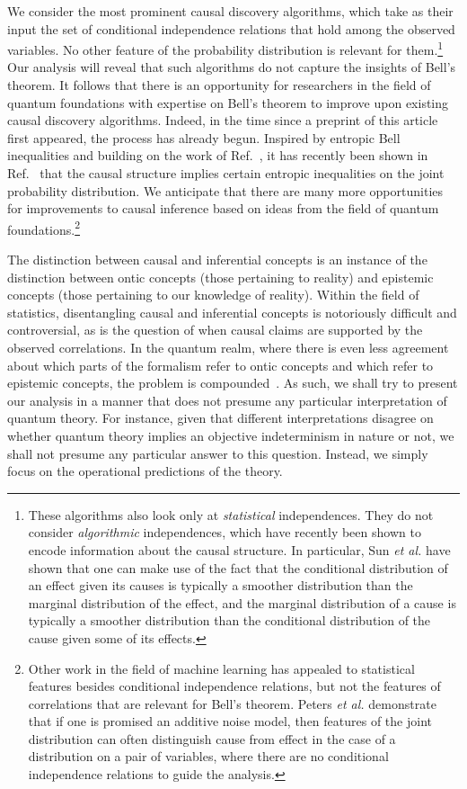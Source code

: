 \documentclass[letterpaper,onecolumn,nofootinbib]{revtex4}
\begin{document}
 
We consider the most prominent causal discovery algorithms, which take as their input the set of conditional independence relations that hold among the observed variables.  No other feature of the probability distribution is relevant for them.\footnote{These algorithms also look only at \emph{statistical} independences.  They do not consider \emph{algorithmic} independences, which have recently been shown to encode information about the causal structure.  In particular, Sun \emph{et al.}\cite{Sun} have shown that one can make use of the fact that the conditional distribution of an effect given its causes is typically a smoother distribution than the marginal distribution of the effect, and the marginal distribution of a cause is typically a smoother distribution than the conditional distribution of the cause given some of its effects.}
Our analysis will reveal that such algorithms do not capture the insights of Bell's theorem.  It follows that there is an opportunity for researchers in the field of quantum foundations with expertise on Bell's theorem to improve upon existing causal discovery algorithms.   
Indeed, in the time since a preprint of this article first appeared, the process has already begun. 
Inspired by entropic Bell inequalities and building on the work of Ref.~\cite{FritzChaves}, it has recently been shown in Ref.~\cite{Chavesetal} that the causal structure implies certain entropic inequalities on the joint probability distribution.  We anticipate that there are many more opportunities for improvements to causal inference 
based on ideas from the field of quantum foundations.\footnote{Other work in the field of machine learning has appealed to statistical features besides conditional independence relations, but not the features of correlations that are relevant for Bell's theorem.  Peters \emph{et al.}\cite{Peters} demonstrate that if one is promised an additive noise model, then features of the joint distribution can often distinguish cause from effect in the case of a  distribution on a pair of variables, where there are no conditional independence relations to guide the analysis.}

The distinction between causal and inferential concepts is an instance of
the distinction between ontic concepts (those pertaining to reality) and
epistemic concepts (those pertaining to our knowledge of reality).  Within
the field of statistics, disentangling causal and inferential concepts is
notoriously difficult and controversial, as is the question of when causal
claims are supported by the observed correlations. In the quantum realm,
where there is even less agreement about which parts of the formalism refer
to ontic concepts and which refer to epistemic concepts, the problem is
compounded~\cite{Harrigan2010}.  As such, we shall try to present our analysis in
a manner that does not presume any particular interpretation of quantum
theory.  For instance, given that different interpretations disagree on
whether quantum theory implies an objective indeterminism in nature or not,
we shall not presume any particular answer to this question.  Instead, we
simply focus on the operational predictions of the theory. 
\end{document}
